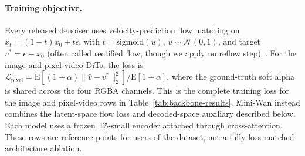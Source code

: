 \documentclass[10pt,twocolumn]{article}
\begin{document}
\paragraph{Training objective.} Every released denoiser uses velocity-prediction flow matching on
$x_t=(1-t)x_0+t\epsilon$, with $t=\mathrm{sigmoid}(u)$, $u\sim\mathcal N(0,1)$, and target
$v^*=\epsilon-x_0$ (often called rectified flow, though we apply no reflow step)~\cite{peebles2023dit,lipman2023flow}.
For the image and pixel-video DiTs, the loss is
$\mathcal L_{\mathrm{pixel}}=\mathrm E[(1+\alpha)\|\hat v-v^*\|_2^2]/\mathrm E[1+\alpha]$,
where the ground-truth soft alpha is shared across the four RGBA channels. This is the complete training
loss for the image and pixel-video rows in Table~\ref{tab:backbone-results}. Mini-Wan instead combines the
latent-space flow loss and decoded-space auxiliary described below. Each model uses a frozen T5-small
encoder attached through cross-attention. These rows are reference points for users of the dataset, not a
fully loss-matched architecture ablation.
\end{document}
